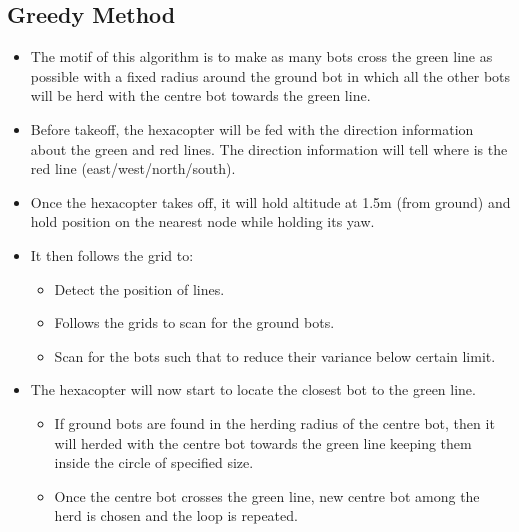 \documentclass[12pt]{article}
\begin{document}
\subsection{Greedy Method}
\begin{itemize}
    \item The motif of this algorithm is to make as many bots cross the green line as possible with a fixed radius around the ground bot in which all the other bots will be herd with the centre bot towards the green line.
    \item Before takeoff, the hexacopter will be fed with the direction information about the green and red lines. The direction information will tell where is the red line (east/west/north/south).
    \item Once the hexacopter takes off, it will hold altitude at 1.5m (from ground) and hold position on the nearest node while holding its yaw.
    \item It then follows the grid to:
        \begin{itemize}
            \item Detect the position of lines.
            \item Follows the grids to scan for the ground bots.
            \item Scan for the bots such that to reduce their variance below certain limit.
        \end{itemize}
    \item The hexacopter will now start to locate the closest bot to the green line.
        \begin{itemize}
        \item If ground bots are found in the herding radius of the centre bot, then it will herded with the centre bot towards the green line keeping them inside the circle of specified size. 
        \item Once the centre bot crosses the green line, new centre bot among the herd is chosen and the loop is repeated.
        \end{itemize}
\end{itemize}
\end{document}
